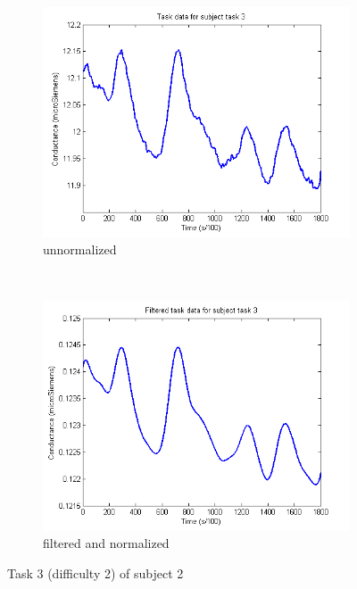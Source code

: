 \documentclass[11pt,leqno,a4paper]{report} %
\begin{document}
\begin{figure}[h!]
\hspace*{-.2\textwidth}        \centering
        \begin{subfigure}[b]{0.7\textwidth}
                \includegraphics[width=\textwidth]{measurements/singletaskunnormal.png}
                \caption{unnormalized}
                \label{fig:singleunnormal}
        \end{subfigure}%
        ~ %
        \begin{subfigure}[b]{0.7\textwidth}
                \includegraphics[width=\textwidth]{measurements/singletaskfilt.png}
                \caption{filtered and normalized}
                \label{fig:singlefiltered}
        \end{subfigure}
        \caption{Task 3 (difficulty 2) of subject 2}\label{fig:animals}
\end{figure}
\end{document}
